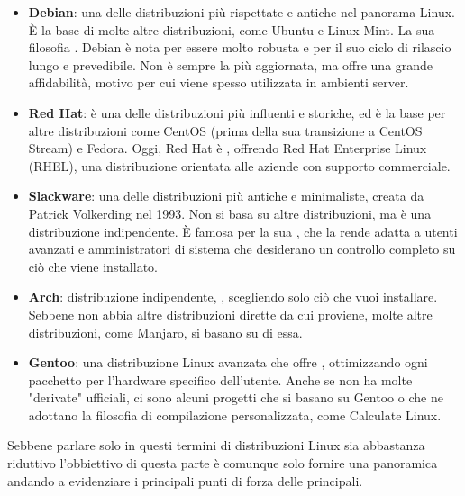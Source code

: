\begin{itemize}
    \item \textbf{Debian}: una delle distribuzioni più rispettate e antiche nel panorama Linux. È la base di molte altre distribuzioni, come Ubuntu e Linux Mint. La sua filosofia . Debian è nota per essere molto robusta e per il suo ciclo di rilascio lungo e prevedibile. Non è sempre la più aggiornata, ma offre una grande affidabilità, motivo per cui viene spesso utilizzata in ambienti server.
    \item \textbf{Red Hat}: è una delle distribuzioni più influenti e storiche, ed è la base per altre distribuzioni come CentOS (prima della sua transizione a CentOS Stream) e Fedora. Oggi, Red Hat è , offrendo Red Hat Enterprise Linux (RHEL), una distribuzione orientata alle aziende con supporto commerciale.
    \item \textbf{Slackware}: una delle distribuzioni più antiche e minimaliste, creata da Patrick Volkerding nel 1993. Non si basa su altre distribuzioni, ma è una distribuzione indipendente. È famosa per la sua , che la rende adatta a utenti avanzati e amministratori di sistema che desiderano un controllo completo su ciò che viene installato.
    \item \textbf{Arch}: distribuzione indipendente, , scegliendo solo ciò che vuoi installare. Sebbene non abbia altre distribuzioni dirette da cui proviene, molte altre distribuzioni, come Manjaro, si basano su di essa.
    \item \textbf{Gentoo}: una distribuzione Linux avanzata che offre , ottimizzando ogni pacchetto per l'hardware specifico dell'utente. Anche se non ha molte "derivate" ufficiali, ci sono alcuni progetti che si basano su Gentoo o che ne adottano la filosofia di compilazione personalizzata, come Calculate Linux.
\end{itemize}
Sebbene parlare solo in questi termini di distribuzioni Linux sia abbastanza riduttivo l'obbiettivo di questa parte è comunque solo fornire una panoramica andando a evidenziare i principali punti di forza delle principali.


